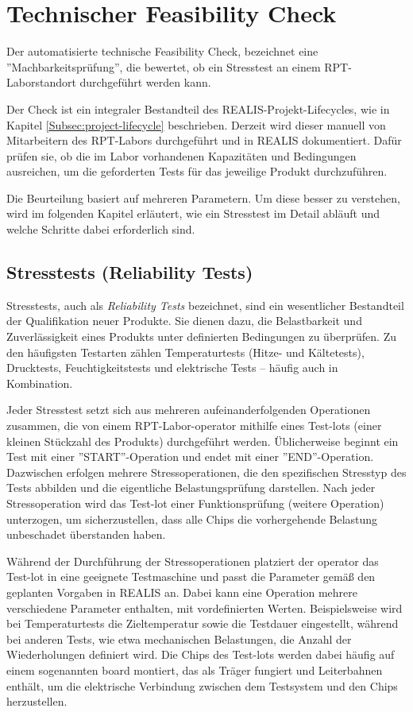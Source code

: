 \section{Technischer Feasibility Check}
Der automatisierte technische Feasibility Check, bezeichnet eine ''Machbarkeitsprüfung'', die bewertet, ob ein Stresstest an einem \gls{RPT}-Laborstandort durchgeführt werden kann.

Der Check ist ein integraler Bestandteil des \gls{REALIS}-Projekt-Lifecycles, wie in Kapitel \ref{Subsec:project-lifecycle} beschrieben. Derzeit wird dieser manuell von Mitarbeitern des \gls{RPT}-Labors durchgeführt und in \gls{REALIS} dokumentiert. Dafür prüfen sie, ob die im Labor vorhandenen Kapazitäten und Bedingungen ausreichen, um die geforderten Tests für das jeweilige Produkt durchzuführen.

Die Beurteilung basiert auf mehreren Parametern. Um diese besser zu verstehen, wird im folgenden Kapitel erläutert, wie ein Stresstest im Detail abläuft und welche Schritte dabei erforderlich sind.


\subsection{Stresstests (Reliability Tests)}

Stresstests, auch als \textit{Reliability Tests} bezeichnet, sind ein wesentlicher Bestandteil der Qualifikation neuer Produkte. Sie dienen dazu, die Belastbarkeit und Zuverlässigkeit eines Produkts unter definierten Bedingungen zu überprüfen. Zu den häufigsten Testarten zählen Temperaturtests (Hitze- und Kältetests), Drucktests, Feuchtigkeitstests und elektrische Tests – häufig auch in Kombination.

Jeder Stresstest setzt sich aus mehreren aufeinanderfolgenden Operationen zusammen, die von einem \gls{RPT}-Labor-\gls{operator} mithilfe eines Test-\glspl{lot} (einer kleinen Stückzahl des Produkts) durchgeführt werden. Üblicherweise beginnt ein Test mit einer ''START''-Operation und endet mit einer ''END''-Operation. Dazwischen erfolgen mehrere Stressoperationen, die den spezifischen Stresstyp des Tests abbilden und die eigentliche Belastungsprüfung darstellen. Nach jeder Stressoperation wird das Test-\gls{lot} einer Funktionsprüfung (weitere Operation) unterzogen, um sicherzustellen, dass alle Chips die vorhergehende Belastung unbeschadet überstanden haben.

Während der Durchführung der Stressoperationen platziert der \gls{operator} das Test-\gls{lot} in eine geeignete Testmaschine und passt die Parameter gemäß den geplanten Vorgaben in \gls{REALIS} an. Dabei kann eine Operation mehrere verschiedene Parameter enthalten, mit vordefinierten Werten. Beispielsweise wird bei Temperaturtests die Zieltemperatur sowie die Testdauer eingestellt, während bei anderen Tests, wie etwa mechanischen Belastungen, die Anzahl der Wiederholungen definiert wird. Die Chips des Test-\glspl{lot} werden dabei häufig auf einem sogenannten \gls{board} montiert, das als Träger fungiert und Leiterbahnen enthält, um die elektrische Verbindung zwischen dem Testsystem und den Chips herzustellen.

